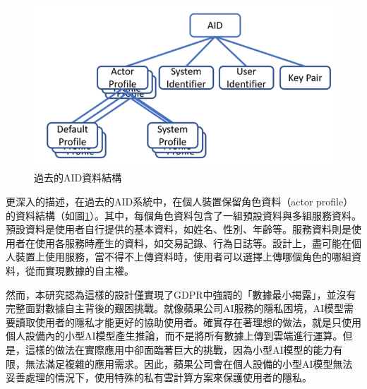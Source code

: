 \begin{figure}
  \centering
  \includegraphics[width=\linewidth]{figures/old-aid-struct.png}
  \caption{過去的AID資料結構}
  \label{fig:old-aid-struct}
\end{figure}
更深入的描述，在過去的AID系統中，在個人裝置保留角色資料（actor profile）的資料結構（如圖\ref{fig:old-aid-struct}）。其中，每個角色資料包含了一組預設資料與多組服務資料。預設資料是使用者自行提供的基本資料，如姓名、性別、年齡等。服務資料則是使用者在使用各服務時產生的資料，如交易記錄、行為日誌等。設計上，盡可能在個人裝置上使用服務，當不得不上傳資料時，使用者可以選擇上傳哪個角色的哪組資料，從而實現數據的自主權。

然而，本研究認為這樣的設計僅實現了GDPR\cite{GDPR2016}中強調的「數據最小揭露」，並沒有完整面對數據自主背後的艱困挑戰。就像蘋果公司AI服務\cite{apple_foundation_models}的隱私困境，AI模型需要讀取使用者的隱私才能更好的協助使用者。確實存在著理想的做法，就是只使用個人設備內的小型AI模型產生推論，而不是將所有數據上傳到雲端進行運算。但是，這樣的做法在實際應用中卻面臨著巨大的挑戰，因為小型AI模型的能力有限，無法滿足複雜的應用需求。因此，蘋果公司會在個人設備的小型AI模型無法妥善處理的情況下，使用特殊的私有雲計算方案\cite{apple_private_cloud_compute}來保護使用者的隱私。

